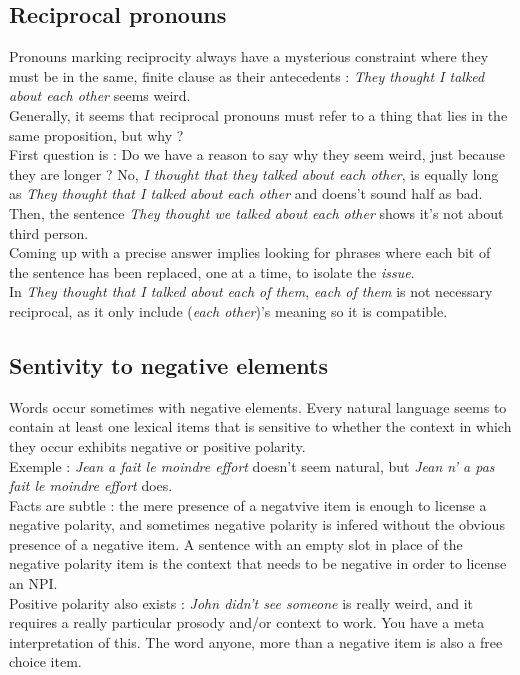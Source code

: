 \documentclass{cours}
\begin{document}
\subsection{Reciprocal pronouns}
Pronouns marking reciprocity always have a mysterious constraint where they must be in the same, finite clause as their antecedents : \textsl{They thought I talked about each other} seems weird.\\
Generally, it seems that reciprocal pronouns must refer to a thing that lies in the same proposition, but why ? \\
First question is : Do we have a reason to say why they seem weird, just because they are longer ? No, \textsl{I thought that they talked about each other}, is equally long as \textsl{They thought that I talked about each other} and doens't sound half as bad. \\
Then, the sentence \textsl{They thought we talked about each other} shows it's not about third person. \\
Coming up with a precise answer implies looking for phrases where each bit of the sentence has been replaced, one at a time, to isolate the \textit{issue}.\\
In \textsl{They thought that I talked about each of them}, \textsl{each of them} is not necessary reciprocal, as it only include (\textsl{each other})'s meaning so it is compatible. 

\subsection{Sentivity to negative elements}
Words occur sometimes with negative elements. Every natural language seems to contain at least one lexical items that is sensitive to whether the context in which they occur exhibits negative or positive polarity.\\
Exemple : \textsl{Jean a fait le moindre effort} doesn't seem natural, but \textsl{Jean \emph{n'} a \emph{pas} fait le moindre effort} does.\\
Facts are subtle : the mere presence of a negatvive item is enough to license a negative polarity, and sometimes negative polarity is infered without the obvious presence of a negative item. A sentence with an empty slot in place of the negative polarity item is the context that needs to be negative in order to license an NPI. \\
Positive polarity also exists : \textsl{John didn't see someone} is really weird, and it requires a really particular prosody and/or context to work. You have a meta interpretation of this. The word anyone, more than a negative item is also a free choice item. 
\end{document}
